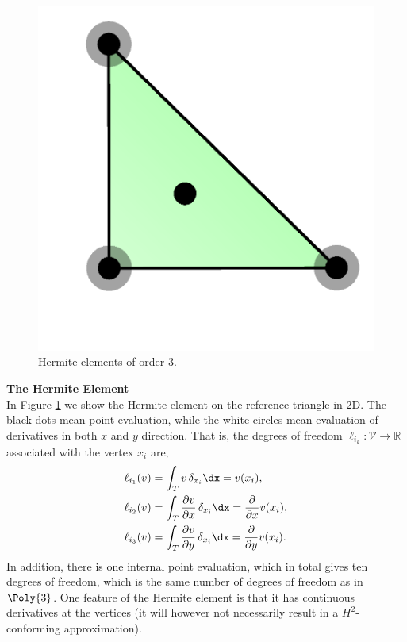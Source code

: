 \begin{figure}
  \centering
  \includegraphics[width=\largefig]{chapters/kirby-6/png/HER_2d.png}
  \caption{Hermite elements of order 3.}
  \label{Hermite}
\end{figure}

\begin{example}{\bf{ The Hermite Element}} \\
In Figure \ref{Hermite} we show the Hermite element on the reference
triangle in 2D. The black dots mean point evaluation, while the white
circles mean evaluation of derivatives in both $x$ and $y$ direction.
That is, the degrees of freedom $\ell_{i_k} : \mathcal{V} \rightarrow
\mathbb{R}$ associated with the vertex $x_i$ are,
\begin{align}
\ell_{i_1} (v) &= \int_{T} {v} \, \delta_{x_i} \dx = v(x_i),    \\
\ell_{i_2} (v) &= \int_{T} \frac{\partial{v}}{\partial x} \, \delta_{x_i} \dx = \frac{\partial}{\partial x} v(x_i),  \\
\ell_{i_3} (v) &= \int_{T} \frac{\partial{v}}{\partial y} \, \delta_{x_i} \dx = \frac{\partial}{\partial y} v(x_i).
\end{align}
In addition, there is one internal point evaluation, which in total gives
ten degrees of freedom, which is the same number of degrees of freedom as
in $\Poly{3}$.  One feature of the Hermite element is that it has continuous
derivatives at the vertices (it will however not necessarily result in
a $H^2$-conforming approximation).
\end{example}

